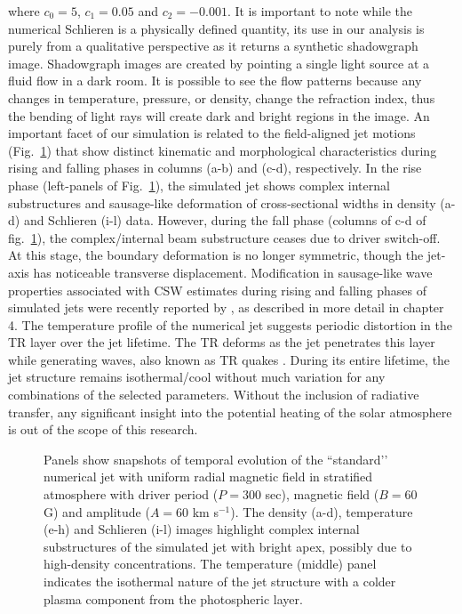where $c_0=5$, $c_1=0.05$ and $c_2=-0.001$. It is important to note while the numerical Schlieren is a physically defined quantity, its use in our analysis is purely from a qualitative perspective as it returns a synthetic shadowgraph image. Shadowgraph images are created by pointing a single light source at a fluid flow in a dark room. It is possible to see the flow patterns because any changes in temperature, pressure, or density, change the refraction index, thus the bending of light rays will create dark and bright regions in the image. An important facet of our simulation is related to the field-aligned jet motions (Fig.~\ref{standard_jet}) that show distinct kinematic and morphological characteristics during rising and falling phases in columns (a-b) and (c-d), respectively. In the rise phase (left-panels of Fig.~\ref{standard_jet}), the simulated jet shows complex internal substructures and sausage-like deformation of cross-sectional widths in density (a-d) and Schlieren (i-l) data. However, during the fall phase (columns of c-d of fig.~\ref{standard_jet}), the complex/internal beam substructure ceases due to driver switch-off. At this stage, the boundary deformation is no longer symmetric, though the jet-axis has noticeable transverse displacement. Modification in sausage-like wave properties associated with CSW estimates during rising and falling phases of simulated jets were recently reported by \cite{Dover2020ApJ90572D}, as described in more detail in chapter 4. The temperature profile of the numerical jet suggests periodic distortion in the TR layer over the jet lifetime. The TR deforms as the jet penetrates this layer while generating waves, also known as TR quakes \citep{Scullion2011ApJ74314S}. During its entire lifetime, the jet structure remains isothermal/cool without much variation for any combinations of the selected parameters. Without the inclusion of radiative transfer, any significant insight into the potential heating of the solar atmosphere is out of the scope of this research. \np
\begin{figure}
\captionsetup[subfigure]{labelformat=empty}
\centering
{}
\caption{Panels show snapshots of temporal evolution of the ``standard’’ numerical jet with uniform radial magnetic field in stratified atmosphere with driver period ($P = 300$ sec), magnetic field ($B = 60$ G) and amplitude ($A = 60$ km s$^{-1}$). The density (a-d), temperature (e-h) and Schlieren (i-l) images highlight complex internal substructures of the simulated jet with bright apex, possibly due to high-density concentrations. The temperature (middle) panel indicates the isothermal nature of the jet structure with a colder plasma component from the photospheric layer.}
\label{standard_jet}
\end{figure}
